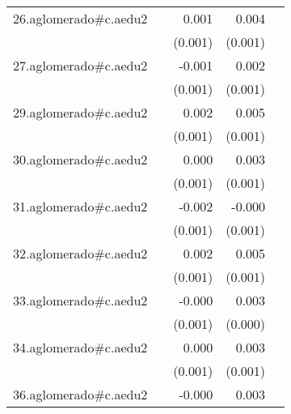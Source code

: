 {\begin{longtable}{l*{4}{D{.}{.}{-1}}}
\addlinespace
26.aglomerado#c.aedu2&                     &       0.001         &       0.004\sym{***}&                     \\
            &                     &     (0.001)         &     (0.001)         &                     \\
\addlinespace
27.aglomerado#c.aedu2&                     &      -0.001         &       0.002\sym{*}  &                     \\
            &                     &     (0.001)         &     (0.001)         &                     \\
\addlinespace
29.aglomerado#c.aedu2&                     &       0.002         &       0.005\sym{***}&                     \\
            &                     &     (0.001)         &     (0.001)         &                     \\
\addlinespace
30.aglomerado#c.aedu2&                     &       0.000         &       0.003\sym{***}&                     \\
            &                     &     (0.001)         &     (0.001)         &                     \\
\addlinespace
31.aglomerado#c.aedu2&                     &      -0.002         &      -0.000         &                     \\
            &                     &     (0.001)         &     (0.001)         &                     \\
\addlinespace
32.aglomerado#c.aedu2&                     &       0.002         &       0.005\sym{***}&                     \\
            &                     &     (0.001)         &     (0.001)         &                     \\
\addlinespace
33.aglomerado#c.aedu2&                     &      -0.000         &       0.003\sym{***}&                     \\
            &                     &     (0.001)         &     (0.000)         &                     \\
\addlinespace
34.aglomerado#c.aedu2&                     &       0.000         &       0.003\sym{***}&                     \\
            &                     &     (0.001)         &     (0.001)         &                     \\
\addlinespace
36.aglomerado#c.aedu2&                     &      -0.000         &       0.003\sym{***}&                     \\

\end{longtable}}
